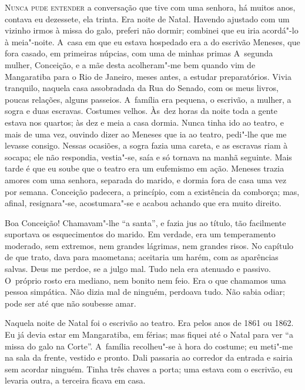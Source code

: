 \begin{linenumbers}

\textsc{Nunca pude entender} a conversação que tive com uma senhora, há muitos
anos, contava eu dezessete, ela trinta. Era noite de Natal. Havendo
ajustado com um vizinho irmos à missa do galo, preferi não dormir;
combinei que eu iria acordá"-lo à meia"-noite. A~casa em que eu estava
hospedado era a do escrivão Meneses, que fora casado, em primeiras
núpcias, com uma de minhas primas A~segunda mulher, Conceição, e a mãe
desta acolheram"-me bem quando vim de Mangaratiba para o Rio de Janeiro,
meses antes, a estudar preparatórios. Vivia tranquilo, naquela casa
assobradada da Rua do Senado, com os meus livros, poucas relações,
alguns passeios. A~família era pequena, o escrivão, a mulher, a sogra e
duas escravas. Costumes velhos. Às~dez horas da noite toda a gente
estava nos quartos; às dez e meia a casa dormia. Nunca tinha ido ao
teatro, e mais de uma vez, ouvindo dizer ao Meneses que ia ao teatro,
pedi"-lhe que me levasse consigo. Nessas ocasiões, a sogra fazia uma
careta, e as escravas riam à socapa; ele não respondia, vestia"-se, saía
e só tornava na manhã seguinte. Mais tarde é que eu soube que o teatro
era um eufemismo em ação. Meneses trazia amores com uma senhora,
separada do marido, e dormia fora de casa uma vez por semana. Conceição
padecera, a princípio, com a existência da comborça; mas, afinal,
resignara"-se, acostumara"-se e acabou achando que era muito direito.

Boa Conceição! Chamavam"-lhe ``a santa'', e fazia jus ao título, tão
facilmente suportava os esquecimentos do marido. Em verdade, era um
temperamento moderado, sem extremos, nem grandes lágrimas, nem grandes
risos. No capítulo de que trato, dava para maometana; aceitaria um
harém, com as aparências salvas. Deus me perdoe, se a julgo mal. Tudo
nela era atenuado e passivo. O~próprio rosto era mediano, nem bonito nem
feio. Era o que chamamos uma pessoa simpática. Não dizia mal de ninguém,
perdoava tudo. Não sabia odiar; pode ser até que não soubesse amar.

Naquela noite de Natal foi o escrivão ao teatro. Era pelos anos de 1861
ou 1862. Eu já devia estar em Mangaratiba, em férias; mas fiquei até o
Natal para ver ``a missa do galo na Corte''. A~família recolheu"-se à
hora do costume; eu meti"-me na sala da frente, vestido e pronto. Dali
passaria ao corredor da entrada e sairia sem acordar ninguém. Tinha três
chaves a porta; uma estava com o escrivão, eu levaria outra, a terceira
ficava em casa.


\end{linenumbers}
